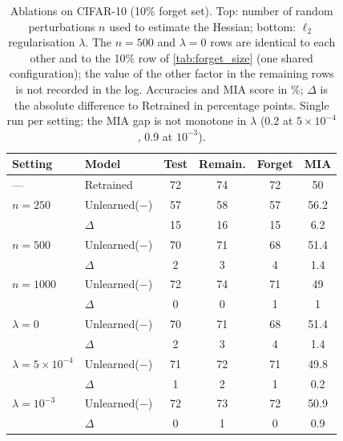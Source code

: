 \begin{table}[t]
  \centering
  \small
  \setlength{\tabcolsep}{4pt}
  \begin{tabular}{@{}llcccc@{}}
    \toprule
    Setting & Model & Test & Remain. & Forget & MIA \\
    \midrule
    --- & Retrained & 72 & 74 & 72 & 50 \\
    \midrule
    $n{=}250$ & Unlearned($-$) & 57 & 58 & 57 & 56.2 \\
     & $\Delta$ & 15 & 16 & 15 & 6.2 \\
    $n{=}500$ & Unlearned($-$) & 70 & 71 & 68 & 51.4 \\
     & $\Delta$ & 2 & 3 & 4 & 1.4 \\
    $n{=}1000$ & Unlearned($-$) & 72 & 74 & 71 & 49 \\
     & $\Delta$ & 0 & 0 & 1 & 1 \\
    \midrule
    $\lambda{=}0$ & Unlearned($-$) & 70 & 71 & 68 & 51.4 \\
     & $\Delta$ & 2 & 3 & 4 & 1.4 \\
    $\lambda{=}5{\times}10^{-4}$ & Unlearned($-$) & 71 & 72 & 71 & 49.8 \\
     & $\Delta$ & 1 & 2 & 1 & 0.2 \\
    $\lambda{=}10^{-3}$ & Unlearned($-$) & 72 & 73 & 72 & 50.9 \\
     & $\Delta$ & 0 & 1 & 0 & 0.9 \\
    \bottomrule
  \end{tabular}
  \caption{Ablations on CIFAR-10 (10\% forget set). Top: number of random perturbations $n$ used to estimate the Hessian; bottom: $\ell_2$ regularisation $\lambda$. The $n{=}500$ and $\lambda{=}0$ rows are identical to each other and to the 10\% row of \cref{tab:forget_size} (one shared configuration); the value of the other factor in the remaining rows is not recorded in the log. Accuracies and MIA score in \%; $\Delta$ is the absolute difference to Retrained in percentage points. Single run per setting; the MIA gap is not monotone in $\lambda$ (0.2 at $5{\times}10^{-4}$, 0.9 at $10^{-3}$).}
  \label{tab:ablations}
\end{table}
